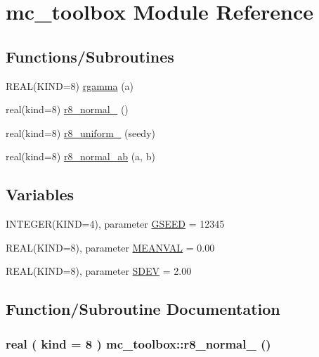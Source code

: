 \hypertarget{namespacemc__toolbox}{
\section{mc\_\-toolbox Module Reference}
\label{namespacemc__toolbox}
}
\subsection*{Functions/Subroutines}
\begin{DoxyCompactItemize}
\item 
REAL(KIND=8) \hyperlink{namespacemc__toolbox_acedafdf57f1c1cd3610359fe837a708d}{rgamma} (a)
\item 
real(kind=8) \hyperlink{namespacemc__toolbox_ab8fa538b6e1b30d65864f793e75425ea}{r8\_\-normal\_} ()
\item 
real(kind=8) \hyperlink{namespacemc__toolbox_a405cb2a6c8bceb2f89fc0da987cd399a}{r8\_\-uniform\_} (seedy)
\item 
real(kind=8) \hyperlink{namespacemc__toolbox_aab33e2e1a35352d1550e81fb86fb1cc9}{r8\_\-normal\_\-ab} (a, b)
\end{DoxyCompactItemize}
\subsection*{Variables}
\begin{DoxyCompactItemize}
\item 
INTEGER(KIND=4), parameter \hyperlink{namespacemc__toolbox_a2b3c4edff260f415453579697b0a5282}{GSEED} = 12345
\item 
REAL(KIND=8), parameter \hyperlink{namespacemc__toolbox_a9e72a666484c36244e37a8083e792dd8}{MEANVAL} = 0.00
\item 
REAL(KIND=8), parameter \hyperlink{namespacemc__toolbox_a5655149a57d9d21f98b7515536fe1a1b}{SDEV} = 2.00
\end{DoxyCompactItemize}


\subsection{Function/Subroutine Documentation}
\hypertarget{namespacemc__toolbox_ab8fa538b6e1b30d65864f793e75425ea}{
\subsubsection[{r8\_\-normal\_\-01}]{\setlength{\rightskip}{0pt plus 5cm}real ( kind = 8 ) mc\_\-toolbox::r8\_\-normal\_ ()}}
\label{namespacemc__toolbox_ab8fa538b6e1b30d65864f793e75425ea}


